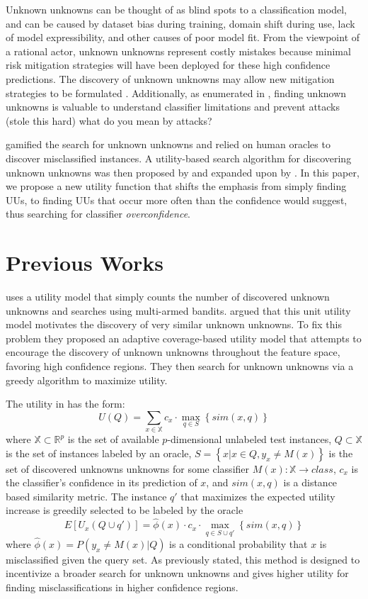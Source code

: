 \documentclass[letterpaper]{article} %
\newcommand{\km}[1]{{\color{red} #1}} %
\begin{document}
Unknown unknowns can be thought of as blind spots to a classification model, and can be caused by dataset bias during training, domain shift during use, lack of model expressibility, and other causes of poor model fit.  From the viewpoint of a rational actor, unknown unknowns represent costly mistakes because minimal risk mitigation strategies will have been deployed for these high confidence predictions.  The discovery of unknown unknowns may allow new mitigation strategies to be formulated \citep{Nushi2016a}.  Additionally, as enumerated in \citep{Bansal2018}, finding unknown unknowns is valuable to understand classifier limitations and prevent attacks (stole this hard) \km{what do you mean by attacks?}

\citet{Attenberg2015} gamified the search for unknown unknowns and relied on human oracles to discover misclassified instances. A utility-based search algorithm for discovering unknown unknowns was then proposed by \citet{Lakkaraju2016} and expanded upon by \citet{Bansal2018}. In this paper, we propose a new utility function that shifts the emphasis from simply finding UUs, to finding UUs that occur more often than the confidence would suggest, thus searching for classifier \textit{overconfidence}. 

\section{Previous Works}

\citet{Lakkaraju2016} uses a utility model that simply counts the number of discovered unknown unknowns and searches using multi-armed bandits. \citet{Bansal2018} argued that this unit utility model motivates the discovery of very similar unknown unknowns. To fix this problem they proposed an adaptive coverage-based utility model that attempts to encourage the discovery of unknown unknowns throughout the feature space, favoring high confidence regions. They then search for unknown unknowns via a greedy algorithm to maximize utility.

The utility in \citet{Bansal2018} has the form: $$U(Q) = \sum_{x \in \mathbb{X}} c_x \cdot \max_{q \in S} \left\{sim\left(x,q \right) \right\}$$ where $\mathbb{X} \subset \mathbb{R}^p$ is the set of available $p$-dimensional unlabeled test instances, $Q \subset \mathbb{X}$ is the set of instances labeled by an oracle, $S = \left\{x|x \in Q, y_x \neq M(x)\right\}$ is the set of discovered unknowns unknowns for some classifier $M(x):\mathbb{X} \rightarrow class$, $c_x$ is the classifier's confidence in its prediction of $x$, and $sim(x,q)$ is a distance based similarity metric.  The instance $q'$ that maximizes the expected utility increase is greedily selected to be labeled by the oracle $$E\left[U_x\left(Q \cup q'\right)\right] = \hat{\phi}(x) \cdot c_x \cdot \max_{q \in S \cup q'} \left\{sim\left(x,q \right) \right\}$$ where $\hat{\phi}(x) = P\left(y_x \neq M(x) |Q \right)$ is a conditional probability that $x$ is misclassified given the query set.  As previously stated, this method is designed to incentivize a broader search for unknown unknowns and gives higher utility for finding misclassifications in higher confidence regions.  
\end{document}
